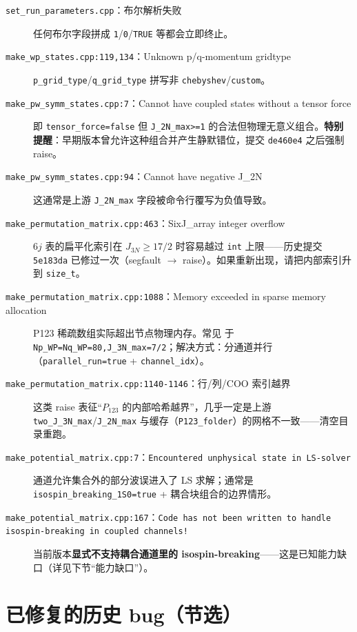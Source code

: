 \begin{description}
  \item[\texttt{set\_run\_parameters.cpp}：布尔解析失败] 任何布尔字段拼成 \texttt{1}/\texttt{0}/\texttt{TRUE} 等都会立即终止。
  \item[\texttt{make\_wp\_states.cpp:119,134}：Unknown p/q-momentum gridtype] \texttt{p\_grid\_type}/\texttt{q\_grid\_type} 拼写非
        \texttt{chebyshev}/\texttt{custom}。
  \item[\texttt{make\_pw\_symm\_states.cpp:7}：Cannot have coupled states without a tensor force] 即 \texttt{tensor\_force=false} 但 \texttt{J\_2N\_max>=1}
        的合法但物理无意义组合。\textbf{特别提醒}：早期版本曾允许这种组合并产生静默错位，提交 \texttt{de460e4} 之后强制 raise。
  \item[\texttt{make\_pw\_symm\_states.cpp:94}：Cannot have negative J\_2N] 这通常是上游 \texttt{J\_2N\_max} 字段被命令行覆写为负值导致。
  \item[\texttt{make\_permutation\_matrix.cpp:463}：SixJ\_array integer overflow] \(6j\) 表的扁平化索引在 \(J_{3N}\ge 17/2\) 时容易越过 \texttt{int}
        上限——历史提交 \texttt{5e183da} 已修过一次（segfault \(\to\) raise）。如果重新出现，请把内部索引升到 \texttt{size\_t}。
  \item[\texttt{make\_permutation\_matrix.cpp:1088}：Memory exceeded in sparse memory allocation] P123 稀疏数组实际超出节点物理内存。常见
        于 \texttt{Np\_WP=Nq\_WP=80,J\_3N\_max=7/2}；解决方式：分通道并行（\texttt{parallel\_run=true} + \texttt{channel\_idx}）。
  \item[\texttt{make\_permutation\_matrix.cpp:1140-1146}：行/列/COO 索引越界] 这类 raise 表征“\(P_{123}\) 的内部哈希越界”，几乎一定是上游
        \texttt{two\_J\_3N\_max}/\texttt{J\_2N\_max} 与缓存（\texttt{P123\_folder}）的网格不一致——清空目录重跑。
  \item[\texttt{make\_potential\_matrix.cpp:7}：\texttt{Encountered unphysical state in LS-solver}] 通道允许集合外的部分波误进入了 LS 求解；通常是
        \texttt{isospin\_breaking\_1S0=true} + 耦合块组合的边界情形。
  \item[\texttt{make\_potential\_matrix.cpp:167}：\texttt{Code has not been written to handle isospin-breaking in coupled channels!}]
        当前版本\textbf{显式不支持耦合通道里的 isospin-breaking}——这是已知能力缺口（详见下节“能力缺口”）。
\end{description}

\section{已修复的历史 bug（节选）}
\label{sec:appF_history_fixes}

